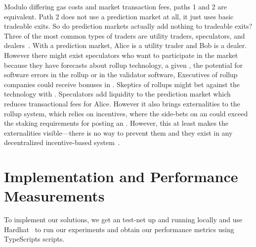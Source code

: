 Modulo differing gas costs and market transaction fees, paths 1 and 2 are equivalent. Path 2 does not use a prediction market at all, it just uses basic tradeable exits. So do prediction markets actually add nothing to tradeable exits? Three of the most common types of traders are utility traders, speculators, and dealers~\cite{Har03}. With a prediction market, Alice is a utility trader and Bob is a dealer. However there might exist speculators who want to participate in the market because they have forecasts about rollup technology, a given \rblock, the potential for software errors in the rollup or in the validator software, \etc Executives of rollup companies could receive bonuses in \final. Skeptics of rollups might bet against the technology with \fail. Speculators add liquidity to the prediction market which reduces transactional fees for Alice. However it also brings externalities to the rollup system, which relies on incentives, where the side-bets on an \rblock could exceed the staking requirements for posting an \rblock. However, this at least makes the externalities visible---there is no way to prevent them and they exist in any decentralized incentive-based system~\cite{FoBo19}. 

\section{Implementation and Performance Measurements} 
To implement our solutions, we get an \arb \nitro test-net up and running locally and use Hardhat~\cite{hardhatonline} to run our experiments and obtain our performance metrics using TypeScripts scripts. 



